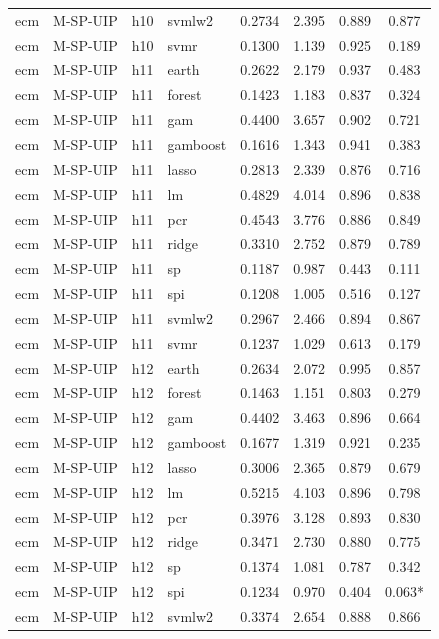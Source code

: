 \begin{ThreePartTable}
\begin{longtable}[t]{llclcccc}
ecm & M-SP-UIP & h10 & svmlw2 & 0.2734 & 2.395 & 0.889 & 0.877\\
ecm & M-SP-UIP & h10 & svmr & 0.1300 & 1.139 & 0.925 & 0.189\\
\addlinespace
ecm & M-SP-UIP & h11 & earth & 0.2622 & 2.179 & 0.937 & 0.483\\
ecm & M-SP-UIP & h11 & forest & 0.1423 & 1.183 & 0.837 & 0.324\\
ecm & M-SP-UIP & h11 & gam & 0.4400 & 3.657 & 0.902 & 0.721\\
ecm & M-SP-UIP & h11 & gamboost & 0.1616 & 1.343 & 0.941 & 0.383\\
ecm & M-SP-UIP & h11 & lasso & 0.2813 & 2.339 & 0.876 & 0.716\\
ecm & M-SP-UIP & h11 & lm & 0.4829 & 4.014 & 0.896 & 0.838\\
ecm & M-SP-UIP & h11 & pcr & 0.4543 & 3.776 & 0.886 & 0.849\\
ecm & M-SP-UIP & h11 & ridge & 0.3310 & 2.752 & 0.879 & 0.789\\
ecm & M-SP-UIP & h11 & sp & 0.1187 & 0.987 & 0.443 & 0.111\\
ecm & M-SP-UIP & h11 & spi & 0.1208 & 1.005 & 0.516 & 0.127\\
ecm & M-SP-UIP & h11 & svmlw2 & 0.2967 & 2.466 & 0.894 & 0.867\\
ecm & M-SP-UIP & h11 & svmr & 0.1237 & 1.029 & 0.613 & 0.179\\
\addlinespace
ecm & M-SP-UIP & h12 & earth & 0.2634 & 2.072 & 0.995 & 0.857\\
ecm & M-SP-UIP & h12 & forest & 0.1463 & 1.151 & 0.803 & 0.279\\
ecm & M-SP-UIP & h12 & gam & 0.4402 & 3.463 & 0.896 & 0.664\\
ecm & M-SP-UIP & h12 & gamboost & 0.1677 & 1.319 & 0.921 & 0.235\\
ecm & M-SP-UIP & h12 & lasso & 0.3006 & 2.365 & 0.879 & 0.679\\
ecm & M-SP-UIP & h12 & lm & 0.5215 & 4.103 & 0.896 & 0.798\\
ecm & M-SP-UIP & h12 & pcr & 0.3976 & 3.128 & 0.893 & 0.830\\
ecm & M-SP-UIP & h12 & ridge & 0.3471 & 2.730 & 0.880 & 0.775\\
ecm & M-SP-UIP & h12 & sp & 0.1374 & 1.081 & 0.787 & 0.342\\
ecm & M-SP-UIP & h12 & spi & 0.1234 & 0.970 & 0.404 & 0.063*\\
ecm & M-SP-UIP & h12 & svmlw2 & 0.3374 & 2.654 & 0.888 & 0.866\\

\end{longtable}
\end{ThreePartTable}
